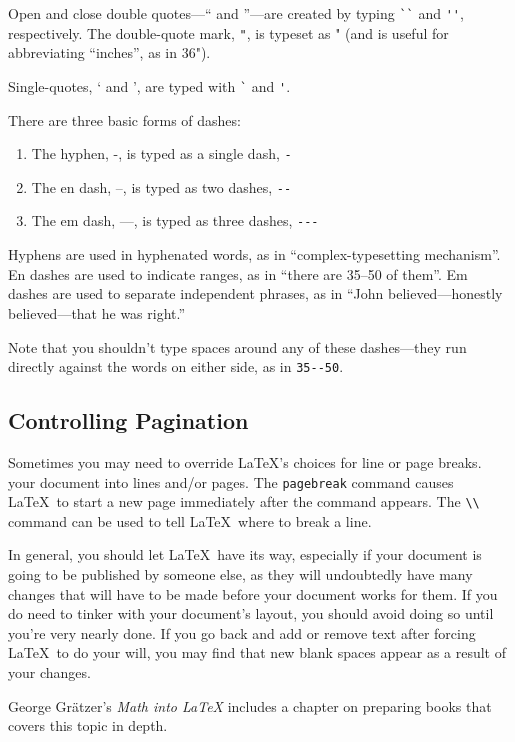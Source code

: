 \documentclass{icmmcm}
\newcommand{\bslash}{\symbol{'134}}%
\newcommand{\bsl}{{\texttt{\bslash}}}
\newcommand{\com}[1]{\bsl\texttt{#1}\xspace}
\begin{document}
{Open and close double quotes---`` and ''---are created by typing
\verb+``+ and \verb+''+, respectively.  The double-quote mark,
\verb+"+, is typeset as " (and is useful for abbreviating ``inches'',
as in 36").

Single-quotes, ` and ', are typed with \verb+`+ and \verb+'+.

There are three basic forms of dashes:
\begin{enumerate}
\item The hyphen, -, is typed as a single dash, \verb+-+
\item The en dash, --, is typed as two dashes, \verb+--+
\item The em dash, ---, is typed as three dashes, \verb+---+
\end{enumerate}

Hyphens are used in hyphenated words, as in ``complex-typesetting
mechanism''.  En dashes are used to indicate ranges, as in ``there are
35--50 of them''.  Em dashes are used to separate independent phrases,
as in ``John believed---honestly believed---that he was right.''

Note that you shouldn't type spaces around any of these dashes---they
run directly against the words on either side, as in \verb+35--50+.


\subsection{Controlling Pagination}%
\label{sec:pagination}

Sometimes you may need to override \LaTeX's choices for line or page
breaks. your document into lines and/or pages.  The \com{pagebreak}
command causes \LaTeX\ to start a new page immediately after the
command appears.  The \verb|\\| command can be used to tell \LaTeX\
where to break a line.

In general, you should let \LaTeX\ have its way, especially if your
document is going to be published by someone else, as they will
undoubtedly have many changes that will have to be made before your
document works for them.  If you do need to tinker with your
document's layout, you should avoid doing so until you're very nearly
done.  If you go back and add or remove text after forcing \LaTeX\ to
do your will, you may find that new blank spaces appear as a result of
your changes.

George Gr\"{a}tzer's \emph{Math into \LaTeX} includes a chapter on
preparing books that covers this topic in depth.


}
\end{document}
